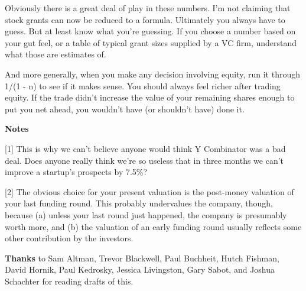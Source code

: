 Obviously there is a great deal of play in these numbers. I'm not
claiming that stock grants can now be reduced to a formula. Ultimately
you always have to guess. But at least know what you're guessing. If you
choose a number based on your gut feel, or a table of typical grant
sizes supplied by a VC firm, understand what those are estimates of.

And more generally, when you make any decision involving equity, run it
through 1/(1 - n) to see if it makes sense. You should always feel
richer after trading equity. If the trade didn't increase the value of
your remaining shares enough to put you net ahead, you wouldn't have (or
shouldn't have) done it.

\textbf{Notes}

{[}1{]} This is why we can't believe anyone would think Y Combinator was
a bad deal. Does anyone really think we're so useless that in three
months we can't improve a startup's prospects by 7.5\%?

{[}2{]} The obvious choice for your present valuation is the post-money
valuation of your last funding round. This probably undervalues the
company, though, because (a) unless your last round just happened, the
company is presumably worth more, and (b) the valuation of an early
funding round usually reflects some other contribution by the investors.

\textbf{Thanks} to Sam Altman, Trevor Blackwell, Paul Buchheit, Hutch
Fishman, David Hornik, Paul Kedrosky, Jessica Livingston, Gary Sabot,
and Joshua Schachter for reading drafts of this.
